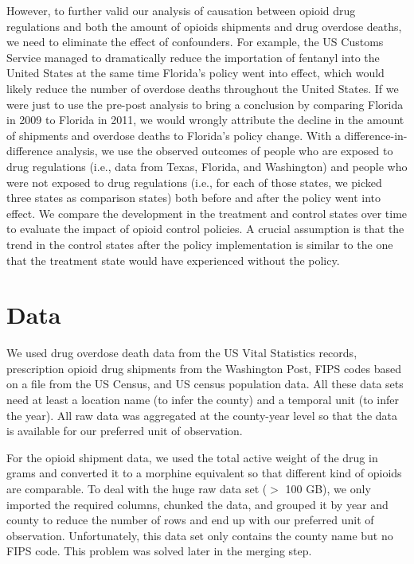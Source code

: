 \documentclass[12pt,letterpaper]{article}
\begin{document}
However, to further valid our analysis of causation between opioid drug regulations and both the amount of opioids shipments and drug overdose deaths, we need to eliminate the effect of confounders. For example, the US Customs Service managed to dramatically reduce the importation of fentanyl into the United States at the same time Florida’s policy went into effect, which would likely reduce the number of overdose deaths throughout the United States. If we were just to use the pre-post analysis to bring a conclusion by comparing Florida in 2009 to Florida in 2011, we would wrongly attribute the decline in the amount of shipments and overdose deaths to Florida’s policy change. With a difference-in-difference analysis, we use the observed outcomes of people who are exposed to drug regulations (i.e., data from Texas, Florida, and Washington) and people who were not exposed to drug regulations (i.e., for each of those states, we picked three states as comparison states) both before and after the policy went into effect. We compare the development in the treatment and control states over time to evaluate the impact of opioid control policies. A crucial assumption is that the trend in the control states after the policy implementation is similar to the one that the treatment state would have experienced without the policy.

\section{Data}
We used drug overdose death data from the US Vital Statistics records, prescription opioid drug shipments from the Washington Post, FIPS codes based on a file from the US Census, and US census population data. All these data sets need at least a location name (to infer the county) and a temporal unit (to infer the year). All raw data was aggregated at the county-year level so that the data is available for our preferred unit of observation.

For the opioid shipment data, we used the total active weight of the drug in grams and converted it to a morphine equivalent so that different kind of opioids are comparable. To deal with the huge raw data set ($>$ 100 GB), we only imported the required columns, chunked the data, and grouped it by year and county to reduce the number of rows and end up with our preferred unit of observation. Unfortunately, this data set only contains the county name but no FIPS code. This problem was solved later in the merging step.
\end{document}
